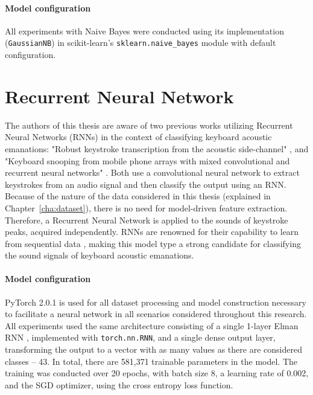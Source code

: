 \documentclass[../main.tex]{subfiles}
\begin{document}
\paragraph{Model configuration}
All experiments with Naive Bayes were conducted using its implementation (\verb|GaussianNB|) in scikit-learn's \verb|sklearn.naive_bayes| module \cite{scikit-learn} with default configuration.

\section{Recurrent Neural Network}
\label{sec:models_rnn}

The authors of this thesis are aware of two previous works utilizing Recurrent Neural Networks (RNNs) in the context
of classifying keyboard acoustic emanations: "Robust keystroke transcription from the acoustic side-channel"
\cite{slater2019robust}, and "Keyboard snooping from mobile phone arrays with mixed convolutional and recurrent neural
networks" \cite{giallanza2019keyboard_snooping}. Both use a convolutional neural network to extract
keystrokes from an audio signal and then classify the output using an RNN. Because of the nature of the data 
considered in this thesis (explained in Chapter~\ref{cha:dataset}), there is no need for model-driven feature extraction.
Therefore, a Recurrent Neural Network is applied to the sounds of keystroke peaks, acquired independently.
RNNs are renowned for their capability to learn from sequential data \cite{elman1990finding, yu2019rnn_review},
making this model type a strong candidate for classifying the sound signals of keyboard acoustic emanations.

\paragraph{Model configuration}
PyTorch 2.0.1 \cite{paszke2019pytorch} is used for all dataset processing and model construction necessary to facilitate a neural network in all scenarios considered throughout this research. All experiments used the same architecture consisting of a single 1-layer Elman RNN \cite{elman1990finding}, implemented with \verb|torch.nn.RNN|, and a single dense output layer, transforming the output to a vector with as many values as there are considered classes -- 43. In total, there are 581,371 trainable parameters in the model. The training was conducted over 20 epochs, with batch size 8, a learning rate of 0.002, and the SGD optimizer, using the cross entropy loss function.
\end{document}
